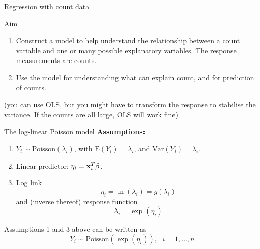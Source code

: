 \documentclass[
  ignorenonframetext,
]{beamer}
\begin{document}
\begin{frame}{Regression with count data}
\label{regression-with-count-data}
\begin{block}{Aim}
\label{aim}
\begin{enumerate}
\item
  Construct a model to help understand the relationship between a count
  variable and one or many possible explanatory variables. The response
  measurements are counts.
\item
  Use the model for understanding what can explain count, and for
  prediction of counts.
\end{enumerate}

(you can use OLS, but you might have to transform the response to
stabilise the variance. If the counts are all large, OLS will work fine)
\end{block}
\end{frame}

\begin{frame}
\begin{block}{The log-linear Poisson model}
\label{the-log-linear-poisson-model}
\textbf{Assumptions: }

\begin{enumerate}
\item
  \(Y_i \sim \text{Poisson}(\lambda_i)\), with
  \(\text{E}(Y_i)=\lambda_i\), and \(\text{Var}(Y_i)=\lambda_i\).
\item
  Linear predictor: \(\eta_i={\bf x}_i^T \beta\).
\item
  Log link \[\eta_i=\ln(\lambda_i)=g(\lambda_i)\] and (inverse thereof)
  response function \[\lambda_i=\exp(\eta_i)\]
\end{enumerate}

Assumptions 1 and 3 above can be written as
\[Y_i \sim \text{Poisson}(\exp(\eta_i)), \text{ }i=1,\ldots,n\]
\end{block}
\end{frame}
\end{document}
